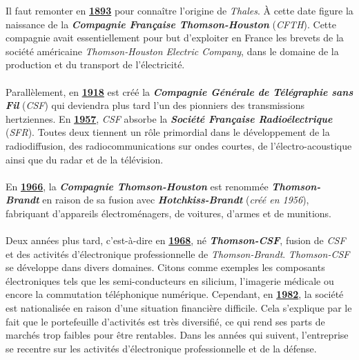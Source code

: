 \documentclass[10pt, oneside, a4paper]{article}
\begin{document}
\hspace{-0.5 cm}Il faut remonter en \underline{\textbf{1893}} pour connaître l'origine de \textit{Thales}. À cette date figure la naissance de la \textbf{\textit{Compagnie Française Thomson-Houston}} (\textit{CFTH}). Cette compagnie avait essentiellement pour but d'exploiter en France les brevets de la société américaine \textit{Thomson-Houston Electric Company}, dans le domaine de la production et du transport de l'électricité. \\ \\
Parallèlement, en \underline{\textbf{1918}} est créé la \textbf{\textit{Compagnie Générale de Télégraphie sans Fil}} (\textit{CSF}) qui deviendra plus tard l'un des pionniers des transmissions hertziennes. En \underline{\textbf{1957}}, \textit{CSF} absorbe la \textbf{\textit{Société Française Radioélectrique}} (\textit{SFR}). Toutes deux tiennent un rôle primordial dans le développement de la radiodiffusion, des radiocommunications sur ondes courtes, de l'électro-acoustique ainsi que du radar et de la télévision. \\ \\
En \underline{\textbf{1966}}, la \textbf{\textit{Compagnie Thomson-Houston}} est renommée \textbf{\textit{Thomson-Brandt}} en raison de sa fusion avec \textbf{\textit{Hotchkiss-Brandt}} (\textit{créé en 1956}), fabriquant d'appareils électroménagers, de voitures, d'armes et de munitions. \\ \\
Deux années plus tard, c'est-à-dire en \underline{\textbf{1968}}, né \textbf{\textit{Thomson-CSF}}, fusion de \textit{CSF} et des activités d'électronique professionnelle de \textit{Thomson-Brandt}. \textit{Thomson-CSF} se développe dans divers domaines. Citons comme exemples les composants électroniques tels que les semi-conducteurs en silicium, l'imagerie médicale ou encore la commutation téléphonique numérique. Cependant, en \underline{\textbf{1982}}, la société est nationalisée en raison d’une situation financière difficile. Cela s’explique par le fait que le portefeuille d’activités est très diversifié, ce qui rend ses parts de marchés trop faibles pour être rentables. Dans les années qui suivent, l’entreprise se recentre sur les activités d’électronique professionnelle et de la défense. \\ \\
\end{document}
